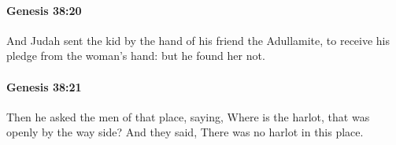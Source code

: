 		\paragraph{Genesis 38:20} %
			\label{GENESIS-38-20}

			And Judah sent the kid by the hand of his friend the Adullamite, to receive his pledge from the woman's hand: but he found her not.


		\paragraph{Genesis 38:21} %
			\label{GENESIS-38-21}

			Then he asked the men of that place, saying, Where is the harlot, that was openly by the way side? And they said, There was no harlot in this place.


